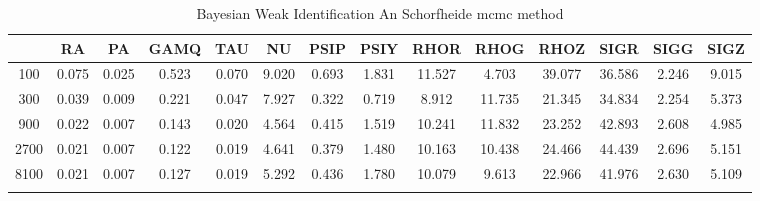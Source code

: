 \documentclass[a4paper,10pt]{article}
\begin{document}
\centering
\begin{longtable}{cccccccccccccc}
\toprule
 & RA & PA & GAMQ & TAU & NU & PSIP & PSIY & RHOR & RHOG & RHOZ & SIGR & SIGG & SIGZ \\
\midrule
100 & 0.075 & 0.025 & 0.523 & 0.070 & 9.020 & 0.693 & 1.831 & 11.527 & 4.703 & 39.077 & 36.586 & 2.246 & 9.015 \\
300 & 0.039 & 0.009 & 0.221 & 0.047 & 7.927 & 0.322 & 0.719 & 8.912 & 11.735 & 21.345 & 34.834 & 2.254 & 5.373 \\
900 & 0.022 & 0.007 & 0.143 & 0.020 & 4.564 & 0.415 & 1.519 & 10.241 & 11.832 & 23.252 & 42.893 & 2.608 & 4.985 \\
2700 & 0.021 & 0.007 & 0.122 & 0.019 & 4.641 & 0.379 & 1.480 & 10.163 & 10.438 & 24.466 & 44.439 & 2.696 & 5.151 \\
8100 & 0.021 & 0.007 & 0.127 & 0.019 & 5.292 & 0.436 & 1.780 & 10.079 & 9.613 & 22.966 & 41.976 & 2.630 & 5.109 \\
\bottomrule
\caption{Bayesian Weak Identification An Schorfheide mcmc method}
\label{table:tbl:WeakAnScho_mcmc}
\end{longtable}
\end{document}
